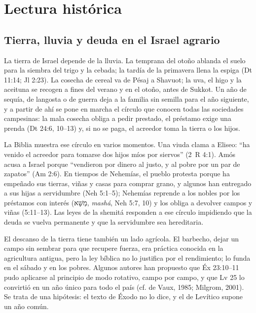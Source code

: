 \documentclass[11pt,letterpaper]{article}
\newcommand{\heb}[1]{\mbox{\foreignlanguage{hebrew}{#1}}}
\begin{document}
\section{Lectura histórica}

\subsection{Tierra, lluvia y deuda en el Israel agrario}
La tierra de Israel depende de la lluvia. La temprana del otoño ablanda el suelo para la siembra del trigo y la cebada; la tardía de la primavera llena la espiga (Dt 11:14; Jl 2:23). La cosecha de cereal va de Pésaj a Shavuot; la uva, el higo y la aceituna se recogen a fines del verano y en el otoño, antes de Sukkot. Un año de sequía, de langosta o de guerra deja a la familia sin semilla para el año siguiente, y a partir de ahí se pone en marcha el círculo que conocen todas las sociedades campesinas: la mala cosecha obliga a pedir prestado, el préstamo exige una prenda (Dt 24:6, 10--13) y, si no se paga, el acreedor toma la tierra o los hijos.

La Biblia muestra ese círculo en varios momentos. Una viuda clama a Eliseo: ``ha venido el acreedor para tomarse dos hijos míos por siervos'' (2~R 4:1). Amós acusa a Israel porque ``vendieron por dinero al justo, y al pobre por un par de zapatos'' (Am 2:6). En tiempos de Nehemías, el pueblo protesta porque ha empeñado sus tierras, viñas y casas para comprar grano, y algunos han entregado a sus hijas a servidumbre (Neh 5:1--5); Nehemías reprende a los nobles por los préstamos con interés (\heb{מַשָּׁא}, \emph{mashá}, Neh 5:7, 10) y los obliga a devolver campos y viñas (5:11--13). Las leyes de la shemitá responden a ese círculo impidiendo que la deuda se vuelva permanente y que la servidumbre sea hereditaria.

El descanso de la tierra tiene también un lado agrícola. El barbecho, dejar un campo sin sembrar para que recupere fuerza, era práctica conocida en la agricultura antigua, pero la ley bíblica no lo justifica por el rendimiento; lo funda en el sábado y en los pobres. Algunos autores han propuesto que Éx 23:10--11 pudo aplicarse al principio de modo rotativo, campo por campo, y que Lv 25 lo convirtió en un año único para todo el país (cf. de Vaux, 1985; Milgrom, 2001). Se trata de una hipótesis: el texto de Éxodo no lo dice, y el de Levítico supone un año común.
\end{document}
